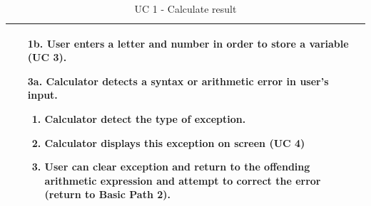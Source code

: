 \documentclass[a4paper]{article}
\begin{document}
\begin{table}[!h]
\begin{tabular}{|p{3cm}|p{9cm}|}
\begin{itemize}[leftmargin=6mm]
		\item [1b.] User enters a letter and number in order to store a variable (UC 3).
		\item [3a.] Calculator detects a syntax or arithmetic error in user's input.
			\begin{enumerate}
				\item Calculator detect the type of exception.
				\item Calculator displays this exception on screen (UC 4)
				\item User can clear exception and return to the offending arithmetic expression and attempt to correct the error (return to Basic Path 2).
			\end{enumerate}
		
		\vspace{-3.5mm}
	\end{itemize}  \\ \hline
\end{tabular}
\caption{UC 1 - Calculate result}
\end{table}
\pagebreak
\end{document}
